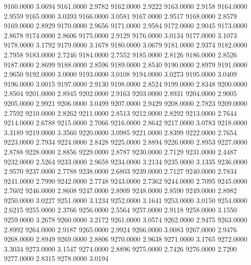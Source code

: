 9160.0000      3.0694
9161.0000      2.9782
9162.0000      2.9222
9163.0000      2.9158
9164.0000      2.9559
9165.0000      3.0393
9166.0000      3.0581
9167.0000      2.9517
9168.0000      2.8579
9169.0000      2.8929
9170.0000      2.9656
9171.0000      2.9584
9172.0000      2.9045
9173.0000      2.8678
9174.0000      2.8606
9175.0000      2.9129
9176.0000      3.0134
9177.0000      3.1073
9178.0000      3.1792
9179.0000      3.1678
9180.0000      3.0679
9181.0000      2.9374
9182.0000      2.7958
9183.0000      2.7246
9184.0000      2.7552
9185.0000      2.8126
9186.0000      2.8526
9187.0000      2.8699
9188.0000      2.8596
9189.0000      2.8540
9190.0000      2.8979
9191.0000      2.9650
9192.0000      3.0000
9193.0000      3.0108
9194.0000      3.0273
9195.0000      3.0409
9196.0000      3.0015
9197.0000      2.9130
9198.0000      2.8524
9199.0000      2.8348
9200.0000      2.8504
9201.0000      2.8945
9202.0000      2.9163
9203.0000      2.8931
9204.0000      2.9005
9205.0000      2.9921
9206.0000      3.0499
9207.0000      2.9429
9208.0000      2.7823
9209.0000      2.7592
9210.0000      2.8262
9211.0000      2.8513
9212.0000      2.8292
9213.0000      2.7644
9214.0000      2.6788
9215.0000      2.7066
9216.0000      2.8642
9217.0000      3.0783
9218.0000      3.3189
9219.0000      3.3560
9220.0000      3.0985
9221.0000      2.8399
9222.0000      2.7654
9223.0000      2.7934
9224.0000      2.8428
9225.0000      2.8894
9226.0000      2.8953
9227.0000      2.8788
9228.0000      2.8856
9229.0000      2.8787
9230.0000      2.7129
9231.0000      2.4487
9232.0000      2.5264
9233.0000      2.9658
9234.0000      3.2134
9235.0000      3.1335
9236.0000      2.9570
9237.0000      2.7788
9238.0000      2.6803
9239.0000      2.7127
9240.0000      2.7834
9241.0000      2.7990
9242.0000      2.7748
9243.0000      2.7362
9244.0000      2.7095
9245.0000      2.7602
9246.0000      2.8608
9247.0000      2.8909
9248.0000      2.8590
9249.0000      2.8982
9250.0000      3.0227
9251.0000      3.1234
9252.0000      3.1641
9253.0000      3.0150
9254.0000      2.6215
9255.0000      2.3766
9256.0000      2.5564
9257.0000      2.9118
9258.0000      3.1550
9259.0000      3.2678
9260.0000      3.2172
9261.0000      3.0574
9262.0000      2.9475
9263.0000      2.8992
9264.0000      2.9187
9265.0000      2.9924
9266.0000      3.0083
9267.0000      2.9476
9268.0000      2.8949
9269.0000      2.8806
9270.0000      2.9638
9271.0000      3.1765
9272.0000      3.3034
9273.0000      3.1547
9274.0000      2.8896
9275.0000      2.7426
9276.0000      2.7200
9277.0000      2.8315
9278.0000      3.0194
